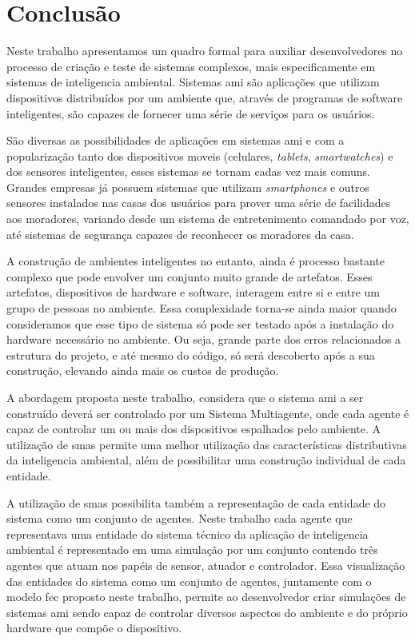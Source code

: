 \chapter{Conclusão}
\label{chap:conclusao}

    Neste trabalho apresentamos um quadro formal para auxiliar desenvolvedores no processo de criação e teste de sistemas complexos, mais especificamente em sistemas de inteligencia ambiental. Sistemas \acrshort{ami} são aplicações que utilizam dispositivos distribuídos por um ambiente que, através de programas de software inteligentes, são capazes de fornecer uma série de serviços para os usuários. 
    
    São diversas as possibilidades de aplicações em sistemas \acrshort{ami} e com a popularização tanto dos dispositivos moveis (celulares, \textit{tablets}, \textit{smartwatches}) e dos sensores inteligentes, esses sistemas se tornam cadas vez mais comuns. Grandes empresas já possuem sistemas que utilizam \textit{smartphones} e outros sensores instalados nas casas dos usuários para prover uma série de facilidades aos moradores, variando desde um sistema de entretenimento comandado por voz, até sistemas de segurança capazes de reconhecer os moradores da casa. 
    
    A construção de ambientes inteligentes no entanto, ainda é processo bastante complexo que pode envolver um conjunto muito grande de artefatos. Esses artefatos, dispositivos de hardware e software, interagem entre si e entre um grupo de pessoas no ambiente. Essa complexidade torna-se ainda maior quando consideramos que esse tipo de sistema só pode ser testado após a instalação do hardware necessário no ambiente. Ou seja, grande parte dos erros relacionados a estrutura do projeto, e até mesmo do código, só será descoberto após a sua construção, elevando ainda mais os custos de produção. 
    
    A abordagem proposta neste trabalho, considera que o sistema \acrshort{ami} a ser construído deverá ser controlado por um Sistema Multiagente, onde cada agente é capaz de controlar um ou mais dos dispositivos espalhados pelo ambiente. A utilização de \acrshort{sma}s permite uma melhor utilização das características distributivas da inteligencia ambiental, além de possibilitar uma construção individual de cada entidade. 
    
    A utilização de \acrshort{sma}s possibilita  também a representação de cada entidade do sistema como um conjunto de agentes. Neste trabalho cada agente que representava uma entidade do sistema técnico da aplicação de inteligencia ambiental é representado em uma simulação por um conjunto contendo três agentes que atuam nos papéis de sensor, atuador e controlador. Essa visualização das entidades do sistema como um conjunto de agentes, juntamente com o modelo \acrshort{fec} proposto neste trabalho, permite ao desenvolvedor criar simulações de sistemas \acrshort{ami} sendo capaz de controlar diversos aspectos do ambiente e do próprio hardware que compõe o dispositivo.
    
